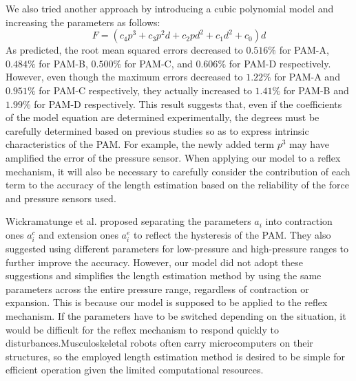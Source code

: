 


We also tried another approach by introducing a cubic polynomial model and increasing the parameters as follows:
\begin{equation}
    \label{eq:model_3d}
    F = (c_4p^3+c_3p^2d+c_2pd^2+c_1d^2+c_0)d
\end{equation}
As predicted, the root mean squared errors decreased to $0.516\%$ for PAM-A, $0.484\%$ for PAM-B, $0.500\%$ for PAM-C, and $0.606\%$ for PAM-D respectively. 
However, even though the maximum errors decreased to $1.22\%$ for PAM-A and $0.951\%$ for PAM-C respectively, they actually increased to $1.41\%$ for PAM-B and $1.99\%$ for PAM-D respectively. This result suggests that, even if the coefficients of the model equation are determined experimentally, the degrees must be carefully determined based on previous studies so as to express intrinsic characteristics of the PAM. For example, the newly added term $p^3$ may have amplified the error of the pressure sensor. When applying our model to a reflex mechanism, it will also be necessary to carefully consider the contribution of each term to the accuracy of the length estimation based on the reliability of the force and pressure sensors used.


Wickramatunge et al. proposed separating the parameters $a_i$ into contraction ones $a^c_i$ and extension ones $a^e_i$ to reflect the hysteresis of the PAM\cite{spring}. They also suggested using different parameters for low-pressure and high-pressure ranges to further improve the accuracy. However, our model did not adopt these suggestions and simplifies the length estimation method by using the same parameters across the entire pressure range, regardless of contraction or expansion. This is because our model is supposed to be applied to the reflex mechanism. If the parameters have to be switched depending on the situation, it would be difficult for the reflex mechanism to respond quickly to disturbances.Musculoskeletal robots often carry microcomputers on their structures, so the employed length estimation method is desired to be simple for efficient operation given the limited computational resources.



